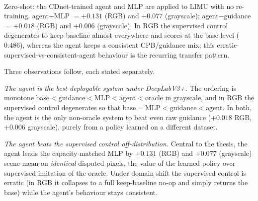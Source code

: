 \documentclass[sn-basic]{sn-jnl}
\newcommand{\Fm}{$F$-measure}
\begin{document}
\begin{table}[t]\centering
\caption{Cross-dataset zero-shot transfer to LIMU under \emph{DeepLabV3+} guidance,
both CPB representations, scene-mean \Fm{} (the reference's LIMU convention
$\approx0.793$). A single CDnet-trained arbiter/control, applied unchanged. Under this
backbone the agent is the best deployable system: it beats the base, the supervised
control \emph{and} raw guidance.}
\label{tab:limu}
\small
{}
\\[3pt]
\footnotesize
Zero-shot: the CDnet-trained agent and MLP are applied to LIMU with no re-training.
agent$-$MLP $=+0.131$ (RGB) and $+0.077$ (grayscale); agent$-$guidance $=+0.018$ (RGB)
and $+0.006$ (grayscale). In RGB the supervised control degenerates to keep-baseline
almost everywhere and scores at the base level ($0.486$), whereas the agent keeps a
consistent CPB/guidance mix; this erratic-supervised-vs-consistent-agent behaviour is
the recurring transfer pattern.
\end{table}

Three observations follow, each stated separately.

\emph{The agent is the best deployable system under DeepLabV3+.} The ordering is monotone
 $\text{base}<\text{guidance}<\text{MLP}<\text{agent}<\text{oracle}$ in grayscale, and
in RGB the supervised control degenerates so that
$\text{base}=\text{MLP}<\text{guidance}<\text{agent}$. In both, the agent is the only
non-oracle system to beat even raw guidance ($+0.018$ RGB, $+0.006$ grayscale), purely
from a policy learned on a different dataset.

\emph{The agent beats the supervised control off-distribution.} Central to the thesis,
the agent leads the capacity-matched MLP by $+0.131$ (RGB) and $+0.077$ (grayscale)
scene-mean on \emph{identical} disputed pixels, the value of the learned policy over
supervised imitation of the oracle. Under domain shift the supervised control is erratic
(in RGB it collapses to a full keep-baseline no-op and simply returns the base) while the
agent's behaviour stays consistent.
\end{document}

